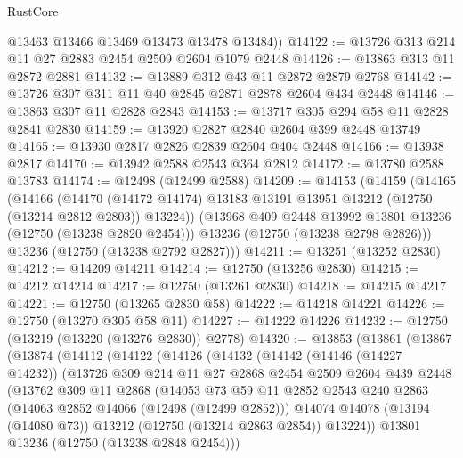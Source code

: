 \begin{lexlean}{RustCore}
\begin{coremodule}
        @13463
        @13466
        @13469
        @13473
        @13478
        @13484))
@14122 := @13726 @313 @214 @11 @27 @2883 @2454 @2509 @2604 @1079 @2448
@14126 := @13863 @313 @11 @2872 @2881
@14132 := @13889 @312 @43 @11 @2872 @2879 @2768
@14142 := @13726 @307 @311 @11 @40 @2845 @2871 @2878 @2604 @434 @2448
@14146 := @13863 @307 @11 @2828 @2843
@14153 := @13717 @305 @294 @58 @11 @2828 @2841 @2830
@14159 := @13920 @2827 @2840 @2604 @399 @2448 @13749
@14165 := @13930 @2817 @2826 @2839 @2604 @404 @2448
@14166 := @13938 @2817
@14170 := @13942 @2588 @2543 @364 @2812
@14172 := @13780 @2588 @13783
@14174 := @12498 (@12499 @2588)
@14209 := @14153
    (@14159
      (@14165
        (@14166
          (@14170 (@14172 @14174) @13183 @13191 @13951 @13212 (@12750 (@13214 @2812 @2803)) @13224))
        (@13968 @409 @2448 @13992 @13801 @13236 (@12750 (@13238 @2820 @2454)))
        @13236
        (@12750 (@13238 @2798 @2826)))
      @13236
      (@12750 (@13238 @2792 @2827)))
@14211 := @13251 (@13252 @2830)
@14212 := @14209 @14211
@14214 := @12750 (@13256 @2830)
@14215 := @14212 @14214
@14217 := @12750 (@13261 @2830)
@14218 := @14215 @14217
@14221 := @12750 (@13265 @2830 @58)
@14222 := @14218 @14221
@14226 := @12750 (@13270 @305 @58 @11)
@14227 := @14222 @14226
@14232 := @12750 (@13219 (@13220 (@13276 @2830)) @2778)
@14320 := @13853
    (@13861
      (@13867
        (@13874
          (@14112
            (@14122
              (@14126
                (@14132
                  (@14142
                    (@14146 (@14227 @14232))
                    (@13726
                      @309
                      @214
                      @11
                      @27
                      @2868
                      @2454
                      @2509
                      @2604
                      @439
                      @2448
                      (@13762
                        @309
                        @11
                        @2868
                        (@14053
                          @73
                          @59
                          @11
                          @2852
                          @2543
                          @240
                          @2863
                          (@14063 @2852 @14066 (@12498 (@12499 @2852)))
                          @14074
                          @14078
                          (@13194 (@14080 @73))
                          @13212
                          (@12750 (@13214 @2863 @2854))
                          @13224))
                      @13801
                      @13236
                      (@12750 (@13238 @2848 @2454)))

\end{coremodule}
\end{lexlean}
